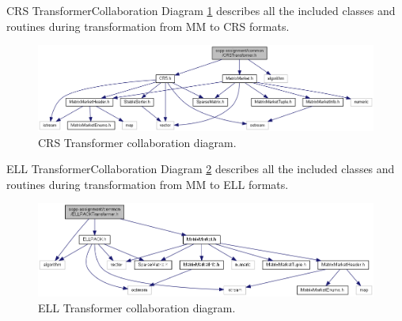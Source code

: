 		\begin{design-element}{\glsdesc{CRS} Transformer}{Collaboration}
			Diagram \ref{fig:crs-transformer} describes all the included classes and routines during transformation from \gls{MM} to \gls{CRS} formats.
			\begin{figure}[!hp]
				\centering
				\includegraphics[width=\textwidth]{others/img/crs-transformer}
				\caption{\gls{CRS} Transformer collaboration diagram.}
				\label{fig:crs-transformer}
			\end{figure}
		\end{design-element}
		\clearpage
		\begin{design-element}{\glsdesc{ELL} Transformer}{Collaboration}
			Diagram \ref{fig:ell-transformer} describes all the included classes and routines during transformation from \gls{MM} to \gls{ELL} formats.
			\begin{figure}[!hp]
				\centering
				\includegraphics[width=\textwidth]{others/img/ellpack-transformer}
				\caption{\gls{ELL} Transformer collaboration diagram.}
				\label{fig:ell-transformer}
			\end{figure}
		\end{design-element}
	

